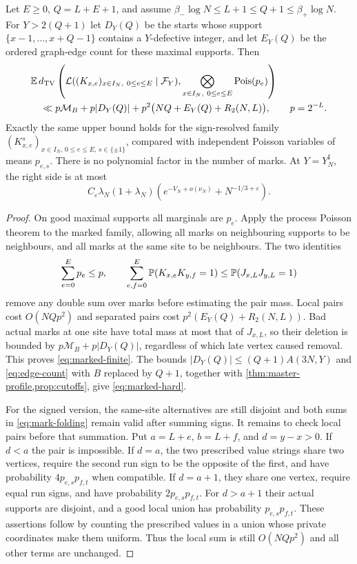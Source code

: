 \begin{theorem}\label{thm:marked-field}
Let $E\ge0$, $Q=L+E+1$, and assume
$\beta_-\log N\le L+1\le Q+1\le\beta_+\log N$.
For $Y>2(Q+1)$ let $D_Y(Q)$ be the starts whose support
$\{x-1,\ldots,x+Q-1\}$ contains a $Y$-defective integer, and let $E_Y(Q)$
be the ordered graph-edge count for these maximal supports. Then
\begin{align}
 &\mathbb E\,d_{\mathrm{TV}}\left(\mathcal L((K_{x,e})_{x\in I_N,\ 0\le e\le E}\mid\mathcal F_Y),
                 \bigotimes_{x\in I_N,\ 0\le e\le E}\operatorname{Pois}(p_e)\right)
 \notag\\
 &\quad\ll p\mathcal M_B+p|D_Y(Q)|
       +p^2\bigl(NQ+E_Y(Q)+R_2(N,L)\bigr),\qquad p=2^{-L}.
       \label{eq:marked-finite}
\end{align}
Exactly the same upper bound holds for the sign-resolved family
$(K^s_{x,e})_{x\in I_N,\,0\le e\le E,\,s\in\{\pm1\}}$, compared with
independent Poisson variables of means $p_{e,s}$. There is no polynomial
factor in the number of marks. At $Y=Y_N^\sharp$,
the right side is at most
\begin{equation}\label{eq:marked-hard}
 C_\varepsilon\lambda_N(1+\lambda_N)
       \left(e^{-V_N+o(\nu_N)}+N^{-1/3+\varepsilon}\right).
\end{equation}
\end{theorem}
\begin{proof}
On good maximal supports all marginals are $p_e$. Apply the process
Poisson theorem to the marked family, allowing all marks on neighbouring
supports to be neighbours, and all marks at the same site to be neighbours.
The two identities
\begin{equation}\label{eq:mark-folding}
 \sum_{e=0}^Ep_e\le p,\qquad
 \sum_{e,f=0}^E\mathbb P(K_{x,e}K_{y,f}=1)\le\mathbb P(J_{x,L}J_{y,L}=1)
\end{equation}
remove any double sum over marks before estimating the pair mass.
Local pairs cost $O(NQp^2)$ and separated pairs cost
$p^2(E_Y(Q)+R_2(N,L))$. Bad actual marks at one site have total mass at
most that of $J_{x,L}$, so their deletion is bounded by
$p\mathcal M_B+p|D_Y(Q)|$, regardless of which late vertex caused removal.
This proves \eqref{eq:marked-finite}.
The bounds $|D_Y(Q)|\le(Q+1)A(3N,Y)$ and \eqref{eq:edge-count} with
$B$ replaced by $Q+1$, together with \cref{thm:master-profile,prop:cutoffs},
give \eqref{eq:marked-hard}.

For the signed version, the same-site alternatives are still disjoint and
both sums in \eqref{eq:mark-folding} remain valid after summing signs.
It remains to check local pairs before that summation. Put $a=L+e$,
$b=L+f$, and $d=y-x>0$. If $d<a$ the pair is impossible. If $d=a$, the
two prescribed value strings share two vertices, require the second run
sign to be the opposite of the first, and have probability
$4p_{e,s}p_{f,t}$ when compatible. If $d=a+1$, they share one vertex,
require equal run signs, and have probability $2p_{e,s}p_{f,t}$.
For $d>a+1$ their actual supports are disjoint, and a good local union has
probability $p_{e,s}p_{f,t}$. These assertions follow by counting the
prescribed values in a union whose private coordinates make them uniform.
Thus the local sum is still $O(NQp^2)$ and all other terms are unchanged.
\end{proof}
